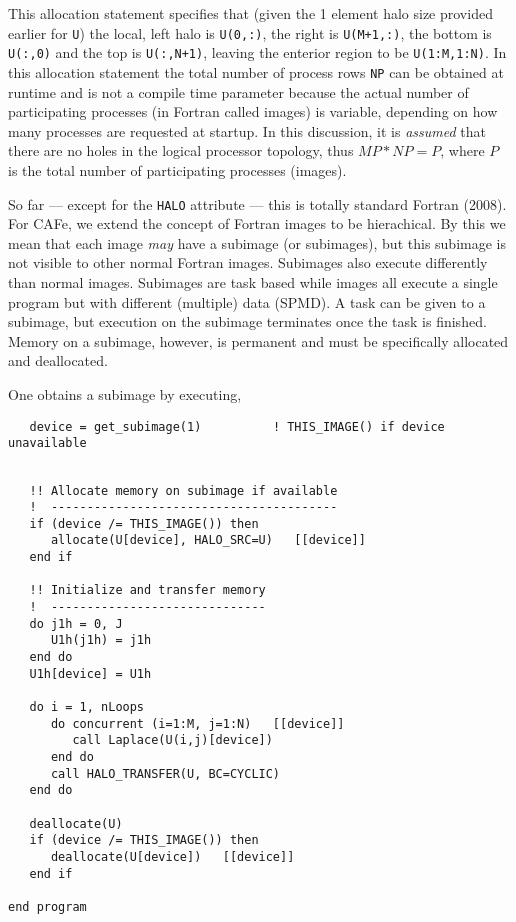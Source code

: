 This allocation statement specifies that (given the 1 element halo size provided earlier for
\texttt{U}) the local, left halo is \texttt{U(0,:)}, the right is \texttt{U(M+1,:)},
the bottom is \texttt{U(:,0)} and the top is \texttt{U(:,N+1)}, leaving the enterior
region to be \texttt{U(1:M,1:N)}.  In this allocation statement the total number of
process rows \texttt{NP} can be obtained at runtime and is not a compile time parameter
because the actual number of participating processes (in Fortran called images) is
variable, depending on how many processes are requested at startup.  In this discussion,
it is \emph{assumed} that there are no holes in the logical processor topology, thus
$MP*NP = P$, where $P$ is the total number of participating processes (images).

So far --- except for the \texttt{HALO} attribute --- this is totally standard Fortran (2008).  For CAFe,
we extend the concept of Fortran images to be hierachical.  By this we mean that each image \emph{may}
have a subimage (or subimages), but this subimage is not visible to other normal Fortran images.
Subimages also execute differently than normal images.  Subimages are task based while images all
execute a single program but with different (multiple) data (SPMD).  A task can be given to a subimage,
but execution on the subimage terminates once the task is finished.  Memory on a subimage, however, is
permanent and must be specifically allocated and deallocated.

One obtains a subimage by executing,
\begin{verbatim}
   device = get_subimage(1)          ! THIS_IMAGE() if device unavailable
\end{verbatim}

\begin{verbatim}

   !! Allocate memory on subimage if available
   !  ----------------------------------------
   if (device /= THIS_IMAGE()) then
      allocate(U[device], HALO_SRC=U)   [[device]]
   end if

   !! Initialize and transfer memory
   !  ------------------------------
   do j1h = 0, J
      U1h(j1h) = j1h
   end do
   U1h[device] = U1h

   do i = 1, nLoops
      do concurrent (i=1:M, j=1:N)   [[device]]
         call Laplace(U(i,j)[device])
      end do
      call HALO_TRANSFER(U, BC=CYCLIC)
   end do

   deallocate(U)
   if (device /= THIS_IMAGE()) then
      deallocate(U[device])   [[device]]
   end if
         
end program
\end{verbatim}



